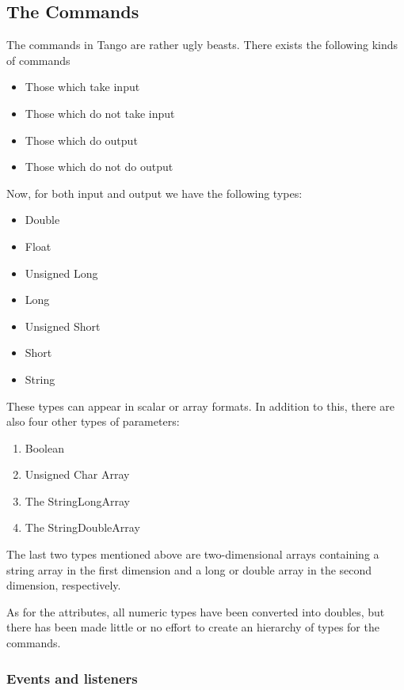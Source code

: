 \subsection{The Commands}

The commands in Tango are rather ugly beasts. There
exists the following kinds of commands
\begin{itemize}
\item Those which take input 
\item Those which do not take input 
\item Those which do output 
\item Those which do not do output 
\end{itemize}
Now, for both input and output we have the following types:
\begin{itemize}
\item Double 
\item Float
\item Unsigned Long
\item Long 
\item Unsigned Short
\item Short 
\item String
\end{itemize}
These types can appear in scalar or array formats. In addition to
this, there are also four other types of parameters:
\begin{enumerate}
\item Boolean
\item Unsigned Char Array
\item The StringLongArray 
\item The StringDoubleArray 
\end{enumerate}
The last two types mentioned above are two-dimensional arrays containing
a string array in the first dimension and a long or double array in
the second dimension, respectively.

As for the attributes, all numeric types have been converted into
doubles, but there has been made little or no effort to create an
hierarchy of types for the commands.


\subsubsection{Events and listeners}

